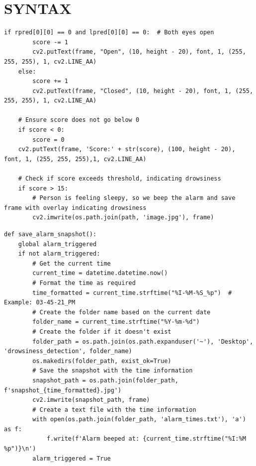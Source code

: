 \documentclass[12pt]{article}
\begin{document}
\section{SYNTAX}
\begin{lstlisting}[style=mystyle, caption={Drowsiness Check}, label=lst:python]
if rpred[0][0] == 0 and lpred[0][0] == 0:  # Both eyes open
        score -= 1
        cv2.putText(frame, "Open", (10, height - 20), font, 1, (255, 255, 255), 1, cv2.LINE_AA)
    else:
        score += 1
        cv2.putText(frame, "Closed", (10, height - 20), font, 1, (255, 255, 255), 1, cv2.LINE_AA)

    # Ensure score does not go below 0
    if score < 0:
        score = 0
    cv2.putText(frame, 'Score:' + str(score), (100, height - 20), font, 1, (255, 255, 255),1, cv2.LINE_AA)

    # Check if score exceeds threshold, indicating drowsiness
    if score > 15:
        # Person is feeling sleepy, so we beep the alarm and save frame with overlay indicating drowsiness
        cv2.imwrite(os.path.join(path, 'image.jpg'), frame)
\end{lstlisting}



\begin{lstlisting}[style=mystyle, caption={Saving Snapshots}, label=lst:python]
def save_alarm_snapshot():
    global alarm_triggered
    if not alarm_triggered:
        # Get the current time
        current_time = datetime.datetime.now()
        # Format the time as required
        time_formatted = current_time.strftime("%I-%M-%S_%p")  # Example: 03-45-21_PM
        # Create the folder name based on the current date
        folder_name = current_time.strftime("%Y-%m-%d")
        # Create the folder if it doesn't exist
        folder_path = os.path.join(os.path.expanduser('~'), 'Desktop', 'drowsiness_detection', folder_name)
        os.makedirs(folder_path, exist_ok=True)
        # Save the snapshot with the time information
        snapshot_path = os.path.join(folder_path, f'snapshot_{time_formatted}.jpg')
        cv2.imwrite(snapshot_path, frame)
        # Create a text file with the time information
        with open(os.path.join(folder_path, 'alarm_times.txt'), 'a') as f:
            f.write(f'Alarm beeped at: {current_time.strftime("%I:%M %p")}\n')
        alarm_triggered = True
\end{lstlisting}
\end{document}
